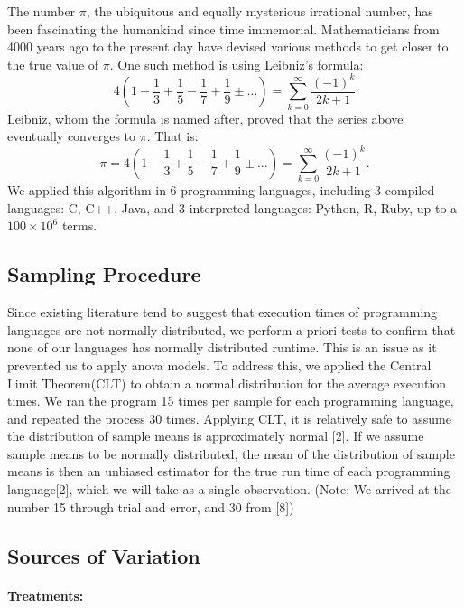 \documentclass[12pt,halfline,a4paper,]{ouparticle}
\begin{document}
The number \(\pi\), the ubiquitous and equally mysterious irrational
number, has been fascinating the humankind since time immemorial.
Mathematicians from 4000 years ago to the present day have devised
various methods to get closer to the true value of \(\pi\). One such
method is using Leibniz's formula: \[
4 \left( 1 - \frac{1}{3} + \frac{1}{5} - \frac{1}{7} + \frac{1}{9} ±... \right) = \sum_{k=0}^{\infty}\frac{(-1)^k}{2k+1}
\] Leibniz, whom the formula is named after, proved that the series
above eventually converges to \(\pi\). That is: \[
\pi = 4 \left( 1 - \frac{1}{3} + \frac{1}{5} - \frac{1}{7} + \frac{1}{9} ±... \right) = \sum_{k=0}^{\infty}\frac{(-1)^k}{2k+1}.
\] We applied this algorithm in 6 programming languages, including 3
compiled languages: C, C++, Java, and 3 interpreted languages: Python,
R, Ruby, up to a \(100 \times 10^6\) terms.

\subsection{Sampling Procedure}\label{sampling-procedure}

Since existing literature tend to suggest that execution times of
programming languages are not normally distributed, we perform a priori
tests to confirm that none of our languages has normally distributed
runtime. This is an issue as it prevented us to apply anova models. To
address this, we applied the Central Limit Theorem(CLT) to obtain a
normal distribution for the average execution times. We ran the program
15 times per sample for each programming language, and repeated the
process 30 times. Applying CLT, it is relatively safe to assume the
distribution of sample means is approximately normal {[}2{]}. If we
assume sample means to be normally distributed, the mean of the
distribution of sample means is then an unbiased estimator for the true
run time of each programming language{[}2{]}, which we will take as a
single observation. (Note: We arrived at the number 15 through trial and
error, and 30 from {[}8{]})

\subsection{Sources of Variation}\label{sources-of-variation}

\paragraph{Treatments:}\label{treatments}
\end{document}
